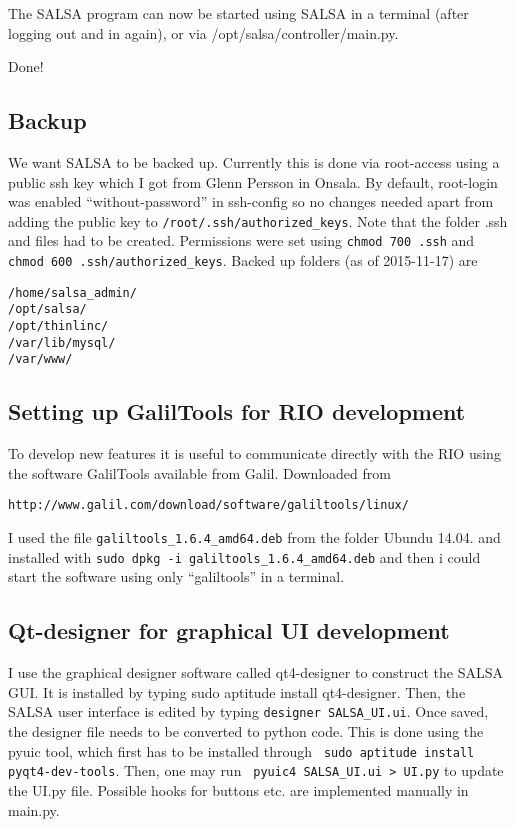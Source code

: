 The SALSA program can now be started using SALSA in a terminal (after logging
out and in again), or via /opt/salsa/controller/main.py.

Done!

\subsection{Backup}
We want SALSA to be backed up. Currently this is done via root-access using a
public ssh key which I got from Glenn Persson in Onsala. By default, root-login
was enabled “without-password” in ssh-config so no changes needed apart from
adding the public key to \verb!/root/.ssh/authorized_keys!. Note that the folder .ssh
and files had to be created. Permissions were set using \verb!chmod 700 .ssh! and
\verb!chmod 600 .ssh/authorized_keys!. Backed up folders (as of 2015-11-17) are
\begin{verbatim}
/home/salsa_admin/ 
/opt/salsa/ 
/opt/thinlinc/ 
/var/lib/mysql/
/var/www/
\end{verbatim}

\subsection{Setting up GalilTools for RIO development}
To develop new features it is useful to communicate directly with the RIO using
the software GalilTools available from Galil. Downloaded from
\begin{verbatim}
http://www.galil.com/download/software/galiltools/linux/
\end{verbatim} 
I used the file
\verb!galiltools_1.6.4_amd64.deb! from the folder Ubundu 14.04.  and installed
with \verb!sudo dpkg -i galiltools_1.6.4_amd64.deb! and then i could start the
software using only “galiltools” in a terminal.

\subsection{Qt-designer for graphical UI development}
I use the graphical designer software called qt4-designer to construct the
SALSA GUI. It is installed by typing sudo aptitude install qt4-designer.
Then, the SALSA user interface is edited by typing \verb!designer SALSA_UI.ui!.
Once saved, the designer file needs to be converted to python code. This
is done using the pyuic tool, which first has to be installed through
\verb! sudo aptitude install pyqt4-dev-tools!. Then, one may run
\verb! pyuic4 SALSA_UI.ui > UI.py! to update the UI.py file. Possible hooks
for buttons etc. are implemented manually in main.py.


